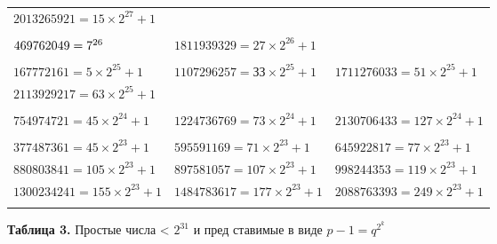 \begin{table}[h]
\centering
\small
\begin{tabular}{|l l l|}
\hline
$2013265921=15\times2^{27}+1$ & & \\ 
\multicolumn{3}{|c|}{} \\
\hline
$469762049=7\time 2^{26}$ & $1811939329=27\times2^{26}+1$ & \\  
\multicolumn{3}{|c|}{} \\
\hline
$167772161=5\times2^{25} + 1$ & $1107296257=ЗЗ\times2^{25}+1$ & $1711276033=51\times2^{25}+1$  \\
$2113929217=63\times2^{25}+1$ & & \\
\multicolumn{3}{|c|}{} \\ 
\hline
$754974721=45\times2^{24}+1$ & $1224736769 = 73\times2^{24}+1$ & $2130706433=127\times2^{24}+1$  \\
\multicolumn{3}{|c|}{} \\
\hline
$377487361=45\times2^{23}+1$ & $595591169=71\times2^{23}+1$ & $645922817=77\times2^{23}+1$ \\
$880803841=105\times2^{23}+1$ & $897581057=107\times2^{23}+1$ & $998244353=119\times2^{23}+1$ \\  
$1300234241=155 \times 2^{23}+1$ & $1484783617=177\times2^{23}+1$ & $2088763393=249\times2^{23}+1$ \\
\multicolumn{3}{|c|}{} \\  
\hline
\end{tabular}
\end{table}
\vspace{-14pt}
\begin{flushleft}
\textbf{Таблица 3.} Простые числа < $2^{31}$ и пред ставимые в виде $p - 1 = q^{2^{k}}$
\end{flushleft}
\pagebreak
\newpage



